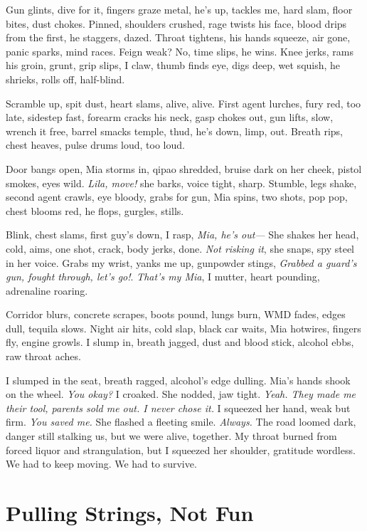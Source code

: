 \documentclass[12pt,oneside]{book}
\begin{document}
Gun glints, dive for it, fingers graze metal, he’s up, tackles me, hard slam, floor bites, dust chokes. Pinned, shoulders crushed, rage twists his face, blood drips from the first, he staggers, dazed. Throat tightens, his hands squeeze, air gone, panic sparks, mind races. Feign weak? No, time slips, he wins. Knee jerks, rams his groin, grunt, grip slips, I claw, thumb finds eye, digs deep, wet squish, he shrieks, rolls off, half-blind.

Scramble up, spit dust, heart slams, alive, alive. First agent lurches, fury red, too late, sidestep fast, forearm cracks his neck, gasp chokes out, gun lifts, slow, wrench it free, barrel smacks temple, thud, he’s down, limp, out. Breath rips, chest heaves, pulse drums loud, too loud. 

Door bangs open, Mia storms in, qipao shredded, bruise dark on her cheek, pistol smokes, eyes wild. \textit{Lila, move!} she barks, voice tight, sharp. Stumble, legs shake, second agent crawls, eye bloody, grabs for gun, Mia spins, two shots, pop pop, chest blooms red, he flops, gurgles, stills. 

Blink, chest slams, first guy’s down, I rasp, \textit{Mia, he’s out—} She shakes her head, cold, aims, one shot, crack, body jerks, done. \textit{Not risking it}, she snaps, spy steel in her voice. Grabs my wrist, yanks me up, gunpowder stings, \textit{Grabbed a guard’s gun, fought through, let’s go!}. \textit{That's my Mia}, I mutter, heart pounding, adrenaline roaring.

Corridor blurs, concrete scrapes, boots pound, lungs burn, WMD fades, edges dull, tequila slows. Night air hits, cold slap, black car waits, Mia hotwires, fingers fly, engine growls. I slump in, breath jagged, dust and blood stick, alcohol ebbs, raw throat aches.

I slumped in the seat, breath ragged, alcohol’s edge dulling. Mia’s hands shook on the wheel. \textit{You okay?} I croaked. She nodded, jaw tight. \textit{Yeah. They made me their tool, parents sold me out. I never chose it.} I squeezed her hand, weak but firm. \textit{You saved me.} She flashed a fleeting smile. \textit{Always.} The road loomed dark, danger still stalking us, but we were alive, together. My throat burned from forced liquor and strangulation, but I squeezed her shoulder, gratitude wordless. We had to keep moving. We had to survive.

\chapter{Pulling Strings, Not Fun}
\end{document}
